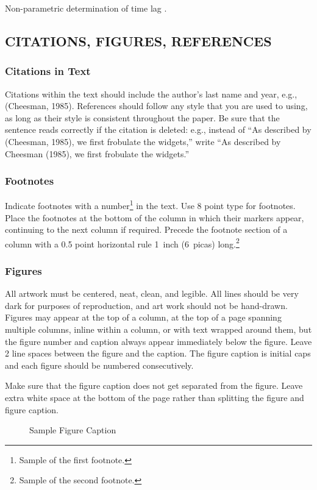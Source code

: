 \documentclass[twoside]{article}
\begin{document}
Non-parametric determination of time lag \cite{ZHOU2006195}.

\subsection{CITATIONS, FIGURES, REFERENCES}


\subsubsection{Citations in Text}

Citations within the text should include the author's last name and
year, e.g., (Cheesman, 1985). References should follow any style that
you are used to using, as long as their style is consistent throughout
the paper.  Be sure that the sentence reads correctly if the citation
is deleted: e.g., instead of ``As described by (Cheesman, 1985), we
first frobulate the widgets,'' write ``As described by Cheesman
(1985), we first frobulate the widgets.''  %

\subsubsection{Footnotes}

Indicate footnotes with a number\footnote{Sample of the first
  footnote.} in the text. Use 8 point type for footnotes. Place the
footnotes at the bottom of the column in which their markers appear,
continuing to the next column if required. Precede the footnote
section of a column with a 0.5 point horizontal rule 1~inch (6~picas)
long.\footnote{Sample of the second footnote.}

\subsubsection{Figures}

All artwork must be centered, neat, clean, and legible.  All lines
should be very dark for purposes of reproduction, and art work should
not be hand-drawn.  Figures may appear at the top of a column, at the
top of a page spanning multiple columns, inline within a column, or
with text wrapped around them, but the figure number and caption
always appear immediately below the figure.  Leave 2 line spaces
between the figure and the caption. The figure caption is initial caps
and each figure should be numbered consecutively.

Make sure that the figure caption does not get separated from the
figure. Leave extra white space at the bottom of the page rather than
splitting the figure and figure caption.
\begin{figure}[h]
\vspace{.3in}
\centerline{}
\vspace{.3in}
\caption{Sample Figure Caption}
\end{figure}
\end{document}
